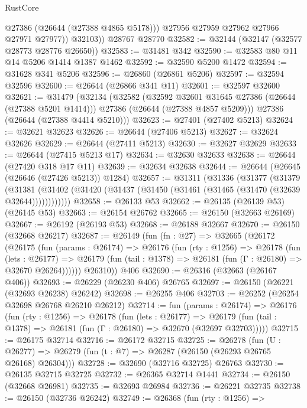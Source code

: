 \begin{lexlean}{RustCore}
\begin{coremodule}
              @27386
              (@26644 (@27388 @4865 @5178)))
            @27956
            @27959
            @27962
            @27966
            @27971
            @27977))
        @32103))
    @28767
    @28770
@32582 := @32144 (@32147 (@32577 @28773 @28776 @26650))
@32583 := @31481 @342
@32590 := @32583 @80 @11 @14 @5206 @1414 @1387 @1462
@32592 := @32590 @5200 @1472
@32594 := @31628 @341 @5206
@32596 := @26860 (@26861 @5206)
@32597 := @32594 @32596
@32600 := @26644 (@26866 @341 @11)
@32601 := @32597 @32600
@32621 := @31479
    (@32134
      (@32582
        (@32592 @32601 @31645 @27386 (@26644 (@27388 @5201 @1414)))
        @27386
        (@26644 (@27388 @4857 @5209)))
      @27386
      (@26644 (@27388 @4414 @5210)))
@32623 := @27401 (@27402 @5213)
@32624 := @32621 @32623
@32626 := @26644 (@27406 @5213)
@32627 := @32624 @32626
@32629 := @26644 (@27411 @5213)
@32630 := @32627 @32629
@32633 := @26644 (@27415 @5213 @17)
@32634 := @32630 @32633
@32638 := @26644 (@27420 @318 @17 @11)
@32639 := @32634 @32638
@32644 := @26644 (@26645 (@26646 (@27426 @5213)) @1284)
@32657 := @31311
    (@31336
      (@31377
        (@31379
          (@31381 (@31402 (@31420 (@31437 (@31450 (@31461 (@31465 (@31470 (@32639 @32644))))))))))))
@32658 := @26133 @53
@32662 := @26135 (@26139 @53) (@26145 @53)
@32663 := @26154 @26762
@32665 := @26150 (@32663 @26169)
@32667 := @26192 (@26193 @53)
@32668 := @26188 @32667
@32670 := @26150 (@32668 @26217)
@32687 := @26149
    (fun (fn : @27) =>
    @32665
      (@26172
        (@26175
          (fun (params : @26174) =>
          @26176
            (fun (rty : @1256) =>
            @26178
              (fun (lets : @26177) =>
              @26179 (fun (tail : @1378) => @26181 (fun (Γ : @26180) => @32670 @26264))))))
        @26310))
    @406
@32690 := @26316 (@32663 (@26167 @406))
@32693 := @26229 (@26230 @406) @26765
@32697 := @26150 (@26221 (@32693 @26238) @26242)
@32698 := @26255 @406
@32703 := @26252 (@26254 @32698 @26768 @26210 @26212)
@32714 := fun (params : @26174) =>
  @26176
    (fun (rty : @1256) =>
    @26178
      (fun (lets : @26177) =>
      @26179 (fun (tail : @1378) => @26181 (fun (Γ : @26180) => @32670 (@32697 @32703)))))
@32715 := @26175 @32714
@32716 := @26172 @32715
@32725 := @26278
    (fun (U : @26277) => @26279 (fun (t : @7) => @26287 (@26150 (@26293 @26765 @26168) @26304)))
@32728 := @32690 (@32716 @32725) @26763
@32730 := @26135 @32715 @32725
@32732 := @26365 @32714 @1441
@32734 := @26150 (@32668 @26981)
@32735 := @32693 @26984
@32736 := @26221 @32735
@32738 := @26150 (@32736 @26242)
@32749 := @26368
    (fun (rty : @1256) =>

\end{coremodule}
\end{lexlean}
